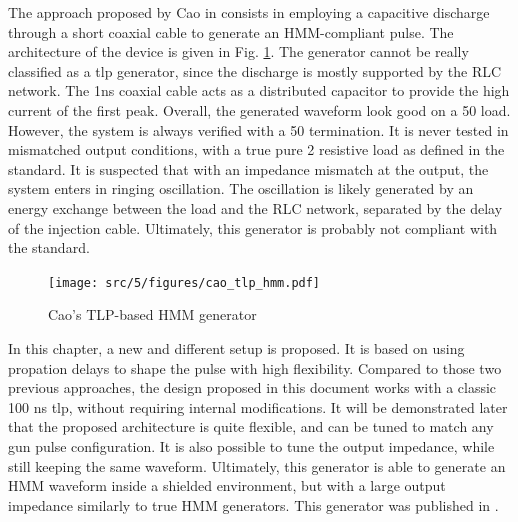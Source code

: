 The approach proposed by Cao in \cite{tlp-based-hmm} consists in employing a capacitive discharge through a short coaxial cable to generate an HMM-compliant pulse.
The architecture of the device is given in Fig. \ref{fig:cao_tlp_hmm}.
The generator cannot be really classified as a \gls{tlp} generator, since the discharge is mostly supported by the RLC network. The 1ns coaxial cable acts as a distributed capacitor to provide the high current of the first peak.
Overall, the generated waveform look good on a 50\textOmega{} load.
However, the system is always verified with a 50\textOmega{} termination.
It is never tested in mismatched output conditions, with a true pure 2\textOmega{} resistive load as defined in the standard.
It is suspected that with an impedance mismatch at the output, the system enters in ringing oscillation.
The oscillation is likely generated by an energy exchange between the load and the RLC network, separated by the delay of the injection cable.
Ultimately, this generator is probably not compliant with the standard.

\begin{figure}[!h]
  \centering
  \texttt{[image: src/5/figures/cao\_tlp\_hmm.pdf]}
  \caption{Cao's TLP-based HMM generator}
  \label{fig:cao_tlp_hmm}
\end{figure}

In this chapter, a new and different setup is proposed.
It is based on using propation delays to shape the pulse with high flexibility.
Compared to those two previous approaches, the design proposed in this document works with a classic 100 ns \gls{tlp}, without requiring internal modifications.
It will be demonstrated later that the proposed architecture is quite flexible, and can be tuned to match any gun pulse configuration.
It is also possible to tune the output impedance, while still keeping the same waveform.
Ultimately, this generator is able to generate an HMM waveform inside a shielded environment, but with a large output impedance similarly to true HMM generators.
This generator was published in \cite{my-publi-tlp-hmm}.
